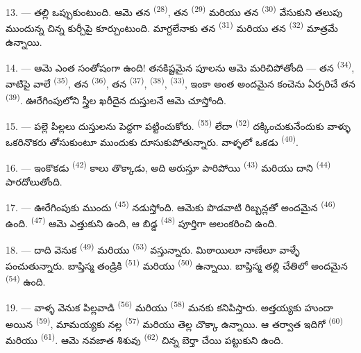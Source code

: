 13. --- తల్లి ఒప్పుకుంటుంది. ఆమె తన  \textsuperscript{(28)}, తన
 \textsuperscript{(29)} మరియు తన  \textsuperscript{(30)}
వేసుకుని తలుపు ముందున్న చిన్న కుర్చీపై కూర్చుంటుంది. మాగ్దలేనాకు తన 
\textsuperscript{(31)} మరియు తన  \textsuperscript{(32)} మాత్రమే ఉన్నాయి.

14. --- ఆమె ఎంత సంతోషంగా ఉంది! తనకిష్టమైన పూలను ఆమె మరిచిపోతోంది — తన 
\textsuperscript{(34)}, వాటిపై వాలే  \textsuperscript{(35)}, తన
 \textsuperscript{(36)}, తన  \textsuperscript{(37)},
 \textsuperscript{(38)},  \textsuperscript{(33)}, ఇంకా అంత
అందమైన కంచెను ఏర్పరిచే తన  \textsuperscript{(39)}. ఊరేగింపులోని స్త్రీల
ఖరీదైన దుస్తులనే ఆమె చూస్తోంది.

15. --- పల్లె పిల్లలు దుస్తులను పెద్దగా పట్టించుకోరు.  \textsuperscript{(55)}
లేదా  \textsuperscript{(52)} దక్కించుకునేందుకు వాళ్ళు ఒకరినొకరు తోసుకుంటూ
ముందుకు దూసుకుపోతున్నారు. వాళ్ళలో ఒకడు  \textsuperscript{(40)}.

16. --- ఇంకొకడు  \textsuperscript{(42)} కాలు తొక్కాడు, అది అరుస్తూ పారిపోయి
 \textsuperscript{(43)} మరియు దాని  \textsuperscript{(44)}
పారదోలుతోంది.

\VUsaut{5.0mm}
\VUsaut{4.0mm}

17. --- ఊరేగింపుకు ముందు  \textsuperscript{(45)} నడుస్తోంది. ఆమెకు పొడవాటి
రిబ్బన్లతో అందమైన  \textsuperscript{(46)} ఉంది. 
\textsuperscript{(47)} ఆమె ఎత్తుకుని ఉంది, ఆ బిడ్డ  \textsuperscript{(48)}
పూర్తిగా అలంకరించి ఉంది.

18. --- దాది వెనుక  \textsuperscript{(49)} మరియు
 \textsuperscript{(53)} వస్తున్నారు. మిఠాయిలూ నాణేలూ వాళ్ళే
పంచుతున్నారు. బాప్తిస్మ తండ్రికి  \textsuperscript{(51)} మరియు
 \textsuperscript{(50)} ఉన్నాయి. బాప్తిస్మ తల్లి చేతిలో అందమైన
 \textsuperscript{(54)} ఉంది.

19. --- వాళ్ళ వెనుక పిల్లవాడి  \textsuperscript{(56)} మరియు 
\textsuperscript{(58)} మనకు కనిపిస్తారు. అత్తయ్యకు హుందా అయిన 
\textsuperscript{(59)}, మామయ్యకు నల్ల  \textsuperscript{(57)} మరియు తెల్ల
చొక్కా ఉన్నాయి. ఆ తర్వాత ఇదిగో  \textsuperscript{(60)} మరియు
 \textsuperscript{(61)}. ఆమె నవజాత శిశువు 
\textsuperscript{(62)} చిన్న బెర్తా చేయి పట్టుకుని ఉంది.

